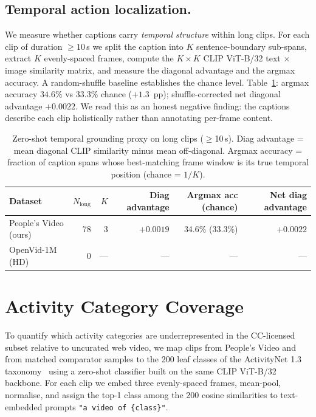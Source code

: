 \documentclass{article}
\begin{document}
\subsection{Temporal action localization.}

We measure whether captions carry \emph{temporal structure} within long clips. For each clip of duration $\geq 10$\,s we split the caption into $K$ sentence-boundary sub-spans, extract $K$ evenly-spaced frames, compute the $K \times K$ CLIP ViT-B/32 text $\times$ image similarity matrix, and measure the diagonal advantage and the argmax accuracy. A random-shuffle baseline establishes the chance level. Table~\ref{tab:temporal_grounding}: argmax accuracy $34.6\%$ vs $33.3\%$ chance ($+1.3$~pp); shuffle-corrected net diagonal advantage $+0.0022$. We read this as an honest negative finding: the captions describe each clip holistically rather than annotating per-frame content.

\begin{table}[t]
\centering
\caption{Zero-shot temporal grounding proxy on long clips ($\geq$10\,s). Diag advantage = mean diagonal CLIP similarity minus mean off-diagonal. Argmax accuracy = fraction of caption spans whose best-matching frame window is its true temporal position (chance = $1/K$).}
\label{tab:temporal_grounding}
\begin{tabular}{lrrrrr}
\toprule
Dataset & $N_{\text{long}}$ & $K$ & Diag advantage & Argmax acc (chance) & Net diag advantage \\
\midrule
People's Video (ours) & 78 & 3 & $+0.0019$ & 34.6\% (33.3\%) & $+0.0022$ \\
OpenVid-1M (HD)       & 0  & --- & ---       & ---             & --- \\
\bottomrule
\end{tabular}
\end{table}

\section{Activity Category Coverage}
\label{app:activity}

To quantify which activity categories are underrepresented in the CC-licensed subset relative to uncurated web video, we map clips from People's Video and from matched comparator samples to the 200 leaf classes of the ActivityNet 1.3 taxonomy~\cite{heilbron2015activitynet} using a zero-shot classifier built on the same CLIP ViT-B/32 backbone. For each clip we embed three evenly-spaced frames, mean-pool, normalise, and assign the top-1 class among the 200 cosine similarities to text-embedded prompts \texttt{"a video of \{class\}"}.
\end{document}
